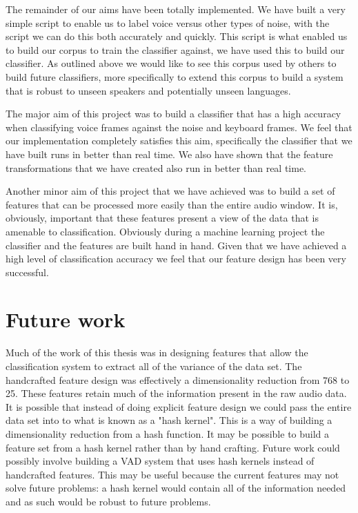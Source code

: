 \documentclass[ %
                    author={Sam Phippen},
                supervisor={Dr. Rafal Bogacz},
                     title={Real time voice activity detectors in noisy personal computing environments},
                  subtitle={},
                    degree={MEng},
                      year={2012} ]{thesis}
\begin{document}
The remainder of our aims have been totally implemented. We have built a very
simple script to enable us to label voice versus other types of noise, with the
script we can do this both accurately and quickly. This script is what enabled
us to build our corpus to train the classifier against, we have used this to
build our classifier. As outlined above we would like to see this corpus used
by others to build future classifiers, more specifically to extend this corpus
to build a system that is robust to unseen speakers and potentially unseen
languages.

The major aim of this project was to build a classifier that has a high
accuracy when classifying voice frames against the noise and keyboard frames.
We feel that our implementation completely satisfies this aim, specifically the
classifier that we have built runs in better than real time. We also have shown
that the feature transformations that we have created also run in better than
real time.

Another minor aim of this project that we have achieved was to build a set of
features that can be processed more easily than the entire audio window.  It
is, obviously, important that these features present a view of the data that is
amenable to classification.  Obviously during a machine learning project the
classifier and the features are built hand in hand. Given that we have achieved
a high level of classification accuracy we feel that our feature design has
been very successful.

\section{Future work}

Much of the work of this thesis was in designing features that allow the
classification system to extract all of the variance of the data set. The
handcrafted feature design was effectively a dimensionality reduction from 768
to 25. These features retain much of the information present in the raw audio
data. It is possible that instead of doing explicit feature design we could
pass the entire data set into to what is known as a "hash
kernel"\cite{Weinberger}. This is a way of building a dimensionality reduction
from a hash function. It may be possible to build a feature set from a hash
kernel rather than by hand crafting. Future work could possibly involve
building a VAD system that uses hash kernels instead of handcrafted features.
This may be useful because the current features may not solve future problems:
a hash kernel would contain all of the information needed and as such would be
robust to future problems.
\end{document}
